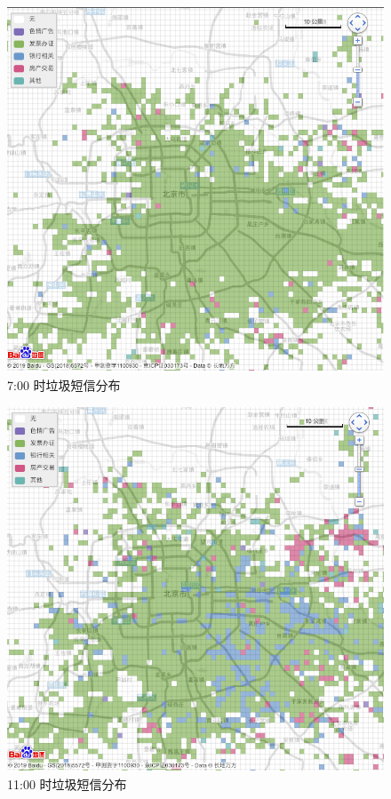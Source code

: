 \documentclass[12pt,a4paper]{article}
\begin{document}
\begin{itemize}
	\begin{flushleft}
		\begin{figure}[H]
			\centering
				\includegraphics[width=\linewidth]{2-7.png}
				\caption{7:00 时垃圾短信分布}
		\end{figure}
	\end{flushleft}

	\begin{flushleft}
		\begin{figure}[H]
			\centering
				\includegraphics[width=\linewidth]{2-11.png}
				\caption{11:00 时垃圾短信分布}
		\end{figure}
	\end{flushleft}


\end{itemize}
\end{document}
